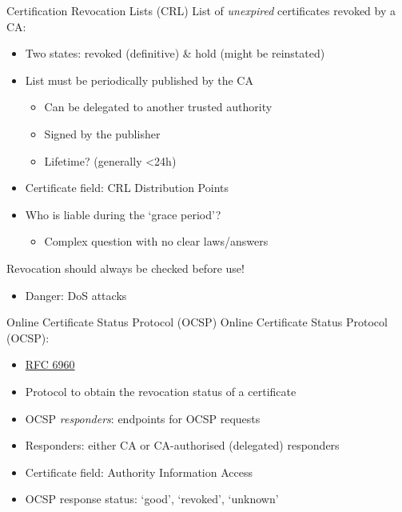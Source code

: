 \begin{frame}{Certification Revocation Lists (CRL)}
  List of \emph{unexpired} certificates revoked by a CA:
  \begin{itemize}[<+(1)->]
    \item Two states: revoked (definitive) \& hold (might be reinstated)
    \item List must be periodically published by the CA
    \begin{itemize}
      \item Can be delegated to another trusted authority
      \item Signed by the publisher
      \item Lifetime? (generally <24h)
    \end{itemize}
    \item Certificate field: CRL Distribution Points
    \item Who is liable during the `grace period'?
    \begin{itemize}
      \item Complex question with no clear laws/answers
    \end{itemize}
  \end{itemize}

  \vspace*{1em}

  \pause
  Revocation should always be checked before use!
  \begin{itemize}[<+(1)->]
    \item Danger: DoS attacks
  \end{itemize}
\end{frame}

\begin{frame}{Online Certificate Status Protocol (OCSP)}
  Online Certificate Status Protocol (OCSP):
  \begin{itemize}[<+(1)->]
    \item \href{https://datatracker.ietf.org/doc/html/rfc6960}{RFC 6960}
    \item Protocol to obtain the revocation status of a certificate
    \item OCSP \emph{responders}: endpoints for OCSP requests
    \item Responders: either CA or CA-authorised (delegated) responders
    \item Certificate field: Authority Information Access
    \item OCSP response status: `good', `revoked', `unknown'
  \end{itemize}
\end{frame}

